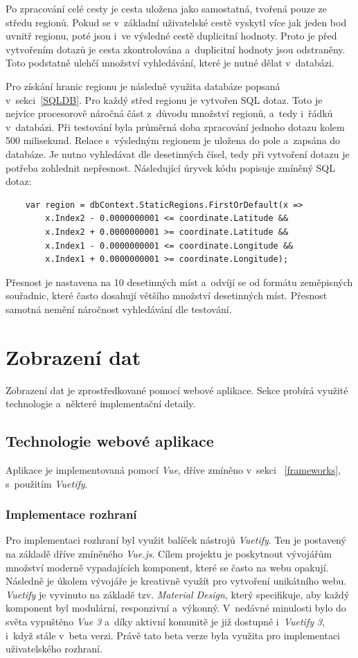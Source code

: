 Po zpracování celé cesty je cesta uložena jako samostatná, tvořená pouze ze středu regionů. Pokud se v~základní uživatelské cestě vyskytl více jak jeden bod uvnitř regionu, poté jsou i~ve výsledné cestě duplicitní hodnoty. Proto je před vytvořením dotazů je cesta zkontrolována a~duplicitní hodnoty jsou odstraněny. Toto podstatně ulehčí množství vyhledávání, které je nutné dělat v~databázi.

Pro získání hranic regionu je následně využita databáze popsaná v~sekci~\ref{SQLDB}. Pro každý střed regionu je vytvořen SQL dotaz. Toto je nejvíce procesorově náročná část z~důvodu množství regionů, a~tedy i~řádků v~databázi. Při testování byla průměrná doba zpracování jednoho dotazu kolem 500 milisekund. Relace s~výsledným regionem je uložena do pole a~zapsána do databáze. Je nutno vyhledávat dle desetinných čísel, tedy při vytvoření dotazu je potřeba zohlednit nepřesnost. Následující úryvek kódu popisuje zmíněný SQL dotaz: 
\begin{verbatim}
    var region = dbContext.StaticRegions.FirstOrDefault(x =>
        x.Index2 - 0.0000000001 <= coordinate.Latitude &&
        x.Index2 + 0.0000000001 >= coordinate.Latitude && 
        x.Index1 - 0.0000000001 <= coordinate.Longitude &&
        x.Index1 + 0.0000000001 >= coordinate.Longitude);
\end{verbatim}
Přesnost je nastavena na 10 desetinných míst a~odvíjí se od formátu zeměpisných souřadnic, které často dosahují většího množství desetinných míst. Přesnost samotná nemění náročnost vyhledávání dle testování. 
\section{Zobrazení dat}
Zobrazení dat je zprostředkované pomocí webové aplikace. Sekce probírá využité technologie a~některé implementační detaily. 

\subsection{Technologie webové aplikace}
Aplikace je implementovaná pomocí \emph{Vue}, dříve zmíněno v~sekci ~\ref{frameworks}, s~použitím \emph{Vuetify}. 
\subsubsection{Implementace rozhraní}
Pro implementaci rozhraní byl využit balíček nástrojů \emph{Vuetify}. Ten je postavený na základě dříve zmíněného \emph{Vue.js}. Cílem projektu je poskytnout vývojářům množství moderně vypadajících komponent, které se často na webu opakují. Následně je úkolem vývojáře je kreativně využít pro vytvoření unikátního webu. \emph{Vuetify} je vyvinuto na základě tzv. \emph{Material Design}, který specifikuje, aby každý komponent byl modulární, responzivní a~výkonný. V~nedávné minulosti bylo do světa vypuštěno \emph{Vue 3} a~díky aktivní komunitě je již dostupné i~\emph{Vuetify 3}, i~když stále v~beta verzi. Právě tato beta verze byla využita pro implementaci uživatelského rozhraní. \cite{vuetify}

